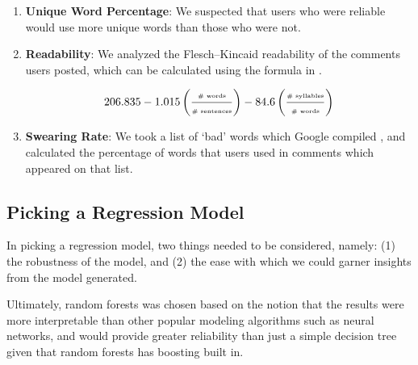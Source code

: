 \begin{enumerate}
    \item \textbf{Unique Word Percentage}: We suspected that users who were
    reliable would use more unique words than those who were not.

    \item \textbf{Readability}: We analyzed the Flesch--Kincaid readability
    \cite{kincaid1975derivation} of the comments users posted, which can be
    calculated using the formula in .

    \begin{equation} \label{eq:fk_eq}
        206.835 - 1.015 \left(\frac{\text{\tiny \# words}}{\text{\tiny \# sentences}}\right) - 84.6 \left(\frac{\text{\tiny \# syllables}}{\text{\tiny \# words}}\right)
    \end{equation}

    \item \textbf{Swearing Rate}: We took a list of `bad' words which Google
    compiled \cite{googlebadwords}, and calculated the percentage of words that
    users used in comments which appeared on that list.

\end{enumerate}





\subsection{Picking a Regression Model} %
\label{sub:picking_a_regression_model}

In picking a regression model, two things needed to be considered, namely: (1)
the robustness of the model, and (2) the ease with which we could garner
insights from the model generated.

Ultimately, random forests \cite{598994} was chosen based on the notion that the
results were more interpretable than other popular modeling algorithms such as
neural networks, and would provide greater reliability than just a simple
decision tree given that random forests has boosting built in.

